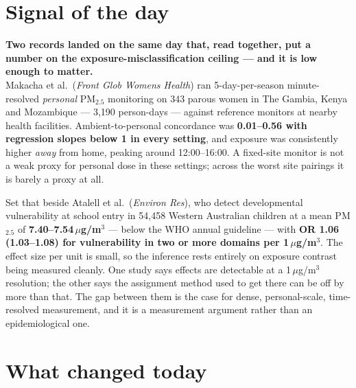 \documentclass[10pt]{article}
\begin{document}
\vspace{6mm}

\section*{\sffamily\bfseries\color{Deep}Signal of the day}
\vspace{-1.5mm}{\color{Amber}\rule{\linewidth}{1.1pt}}\vspace{2.5mm}

\begin{keybox}
{\sffamily\bfseries\small\color{Deep}Two records landed on the same day that, read
together, put a number on the exposure-misclassification ceiling --- and it is low
enough to matter.}\\[1.4mm]
\footnotesize
Makacha et al.\ (\textit{Front Glob Womens Health}) ran 5-day-per-season minute-resolved
\emph{personal} PM$_{2.5}$ monitoring on 343 parous women in The Gambia, Kenya and
Mozambique --- 3{,}190 person-days --- against reference monitors at nearby health
facilities. Ambient-to-personal concordance was \textbf{0.01--0.56 with regression slopes
below 1 in every setting}, and exposure was consistently higher \emph{away} from home,
peaking around 12:00--16:00. A fixed-site monitor is not a weak proxy for personal dose in
these settings; across the worst site pairings it is barely a proxy at all.

Set that beside Atalell et al.\ (\textit{Environ Res}), who detect developmental
vulnerability at school entry in 54{,}458 Western Australian children at a mean PM$_{2.5}$
of \textbf{7.40--7.54\,$\mu$g/m$^3$} --- below the WHO annual guideline --- with
\textbf{OR 1.06 (1.03--1.08) for vulnerability in two or more domains per
1\,$\mu$g/m$^3$}. The effect size per unit is small, so the inference rests entirely on
exposure contrast being measured cleanly. One study says effects are detectable at a
1\,$\mu$g/m$^3$ resolution; the other says the assignment method used to get there can be
off by more than that. The gap between them is the case for dense, personal-scale,
time-resolved measurement, and it is a measurement argument rather than an epidemiological
one.
\end{keybox}

\vspace{3mm}

\section*{\sffamily\bfseries\color{Deep}What changed today}
\vspace{-1.5mm}{\color{Amber}\rule{\linewidth}{1.1pt}}\vspace{2.5mm}
\end{document}
